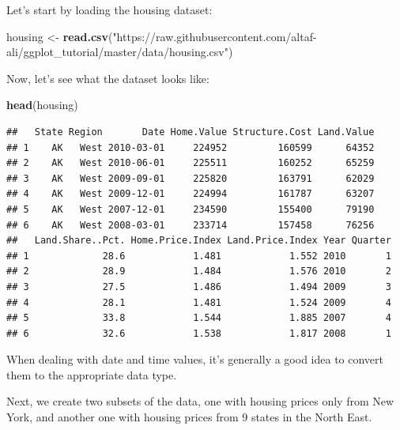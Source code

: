 \documentclass[]{article}
\newenvironment{Shaded}{\begin{snugshade}}{\end{snugshade}}
\newcommand{\KeywordTok}[1]{\textcolor[rgb]{0.13,0.29,0.53}{\textbf{{#1}}}}
\newcommand{\StringTok}[1]{\textcolor[rgb]{0.31,0.60,0.02}{{#1}}}
\newcommand{\NormalTok}[1]{{#1}}
\theoremstyle{definition}
\theoremstyle{definition}
\theoremstyle{definition}
\theoremstyle{remark}
\begin{document}
Let's start by loading the housing dataset:

\begin{Shaded}
\begin{Highlighting}[]
\NormalTok{housing <-}\StringTok{ }\KeywordTok{read.csv}\NormalTok{(}\StringTok{"https://raw.githubusercontent.com/altaf-ali/ggplot_tutorial/master/data/housing.csv"}\NormalTok{)}
\end{Highlighting}
\end{Shaded}

Now, let's see what the dataset looks like:

\begin{Shaded}
\begin{Highlighting}[]
\KeywordTok{head}\NormalTok{(housing)}
\end{Highlighting}
\end{Shaded}

\begin{verbatim}
##   State Region       Date Home.Value Structure.Cost Land.Value
## 1    AK   West 2010-03-01     224952         160599      64352
## 2    AK   West 2010-06-01     225511         160252      65259
## 3    AK   West 2009-09-01     225820         163791      62029
## 4    AK   West 2009-12-01     224994         161787      63207
## 5    AK   West 2007-12-01     234590         155400      79190
## 6    AK   West 2008-03-01     233714         157458      76256
##   Land.Share..Pct. Home.Price.Index Land.Price.Index Year Quarter
## 1             28.6            1.481            1.552 2010       1
## 2             28.9            1.484            1.576 2010       2
## 3             27.5            1.486            1.494 2009       3
## 4             28.1            1.481            1.524 2009       4
## 5             33.8            1.544            1.885 2007       4
## 6             32.6            1.538            1.817 2008       1
\end{verbatim}

When dealing with date and time values, it's generally a good idea to
convert them to the appropriate data type.

\begin{Shaded}
\end{Shaded}

Next, we create two subsets of the data, one with housing prices only
from New York, and another one with housing prices from 9 states in the
North East.
\end{document}
